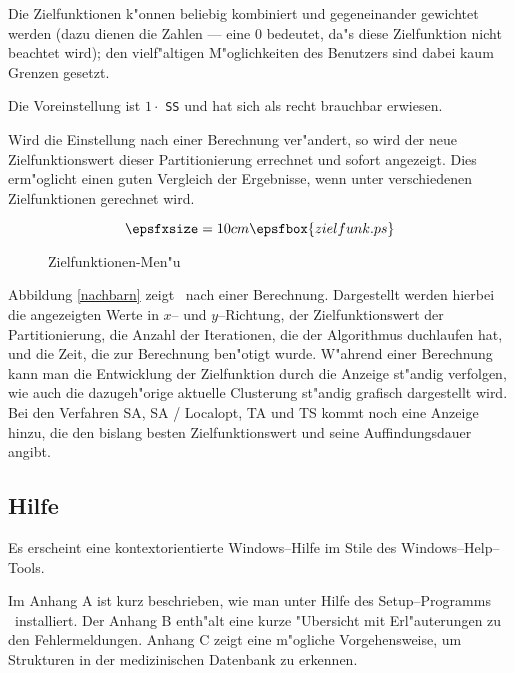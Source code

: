 \begin{description}
	Die Zielfunktionen k"onnen beliebig kombiniert und gegeneinander
	gewichtet werden (dazu dienen die Zahlen --- eine 0 bedeutet, 
	da"s diese Zielfunktion nicht beachtet wird); den vielf"altigen
	M"oglichkeiten des Benutzers sind dabei kaum Grenzen gesetzt.

	Die Voreinstellung ist $1 \cdot$ \verb-SS- und hat sich als recht brauchbar
	erwiesen.

	Wird die Einstellung nach einer Berechnung ver"andert, so wird der 
	neue Zielfunktionswert dieser Partitionierung errechnet und sofort
	angezeigt. Dies erm"oglicht einen guten Vergleich der Ergebnisse,
	wenn unter verschiedenen Zielfunktionen gerechnet wird.

	\begin{figure}[htp]
	\[ \epsfxsize=10cm \epsfbox{zielfunk.ps} \]
		\caption{\label{zielfunk} Zielfunktionen-Men"u}
	\end{figure}

\end{description}

Abbildung \ref{nachbarn} zeigt \Clustering\ nach einer Berechnung.
Dargestellt werden hierbei die angezeigten Werte in $x$-- und $y$--Richtung,
der Zielfunktionswert der Partitionierung, die Anzahl der Iterationen, die
der Algorithmus duchlaufen hat, und die Zeit, die zur Berechnung
ben"otigt wurde. W"ahrend einer Berechnung kann man die Entwicklung der
Zielfunktion durch die Anzeige st"andig verfolgen, wie auch
die dazugeh"orige aktuelle Clusterung st"andig grafisch dargestellt wird.
Bei den Verfahren SA, SA / Localopt, TA und TS kommt noch eine Anzeige
hinzu, die den bislang besten Zielfunktionswert und seine 
Auffindungsdauer angibt.

\subsection*{Hilfe}
Es erscheint eine kontextorientierte Windows--Hilfe im Stile des
Windows--Help--Tools.

Im Anhang A ist kurz beschrieben, wie man unter Hilfe des Setup--Programms
\Clustering\ installiert. Der Anhang B enth"alt eine kurze "Ubersicht
mit Erl"auterungen zu den Fehlermeldungen. Anhang C zeigt eine
m"ogliche Vorgehensweise, um Strukturen in der medizinischen Datenbank
zu erkennen.
